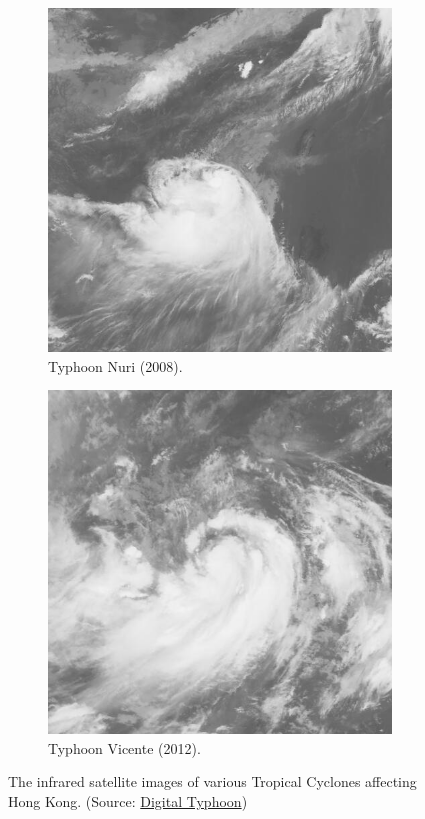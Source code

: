 \begin{figure}[ht!]
\centering
\begin{subfigure}[b]{0.45\textwidth}
\centering
\includegraphics[width=0.8\linewidth]{graphics/MTS108082203.200812.jpg}
\caption{Typhoon Nuri (2008).}
\end{subfigure}
\begin{subfigure}[b]{0.45\textwidth}
\centering
\includegraphics[width=0.8\linewidth]{graphics/MTS212072303.201208.jpg}
\caption{Typhoon Vicente (2012).}
\end{subfigure}
\caption{The infrared satellite images of various Tropical Cyclones affecting Hong Kong. (Source: \href{https://agora.ex.nii.ac.jp/digital-typhoon/index.html.en}{Digital Typhoon})}
\label{fig:TC1}
\end{figure}


